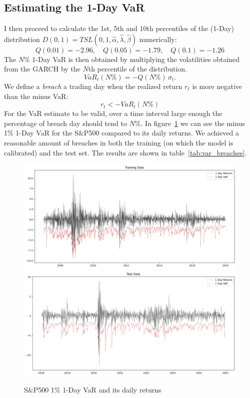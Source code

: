 \documentclass[11pt]{article}
\begin{document}
        \subsection{Estimating the 1-Day VaR}\label{subsec:estimating-the-1-day-var2}
    I then proceed to calculate the 1st, 5th and 10th percentiles of the (1-Day) distribution $D(0,1)=TSL(0,1,\hat \alpha,\hat \lambda,\hat \beta)$ numerically:
        $$ Q(0.01) = -2.96, \quad Q(0.05) = -1.79, \quad Q(0.1) = -1.26  $$
        The $N$\% 1-Day VaR is then obtained by multiplying the volatilities obtained from the GARCH by the $N$th percentile of the distribution.
        \begin{equation}
            VaR_t(N\%) = -Q(N\%) \, \sigma_t.
        \end{equation}
        We define a \textit{breach} a trading day when the realized return $r_t$ is more negative than the minus VaR:
        \begin{equation}
            r_t < - VaR_t(N\%)
        \end{equation}
        For the VaR estimate to be valid, over a time interval large enough the percentage of breach day should tend to $N\%$.
        In figure~\ref{fig:1_day_var} we can see the minus 1\% 1-Day VaR for the S\&P500 compared to its daily returns.
        We achieved a reasonable amount of breaches in both the training (on which the model is calibrated) and the test set.
        The results are shown in table~\ref{tab:var_breaches}.

        \begin{figure}[h!]
            \centering
            \label{fig:1_day_var}
            \includegraphics[width=0.8\linewidth]{img/train1}
            \includegraphics[width=0.8\linewidth]{img/test1}
            \caption{S\&P500 1\% 1-Day VaR and its daily returns}
        \end{figure}
\end{document}
